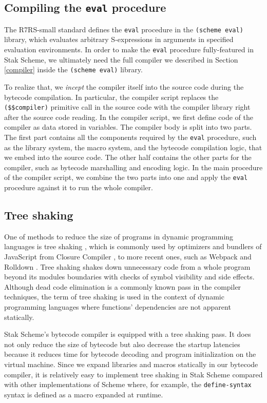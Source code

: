 \documentclass[sigplan, anonymous, review]{acmart}
\begin{document}
\subsection{Compiling the \texttt{eval} procedure} \label{inception}

The R7RS-small standard defines the \texttt{eval} procedure in the
\texttt{(scheme eval)} library, which evaluates arbitrary S-expressions in
arguments in specified evaluation environments.
In order to make the \texttt{eval} procedure fully-featured in Stak Scheme, we
ultimately need the full compiler we described in Section
\ref{compiler} inside the \texttt{(scheme eval)} library.

To realize that, we \textit{incept} the compiler itself into the
source code during the bytecode compilation.
In particular, the compiler script replaces
the \texttt{(\$\$compiler)} primitive call in the source code
with the compiler library right after the source code reading.
In the compiler script, we first define code of the compiler as
data stored in variables.
The compiler body is split into two parts.
The first part contains all the components required by the \texttt{eval}
procedure, such as the library system, the macro system, and the
bytecode compilation logic, that we embed into the source code.
The other half contains the other parts for the compiler, such
as bytecode marshalling and encoding logic.
In the main procedure of the compiler script, we combine the two
parts into one and apply the \texttt{eval} procedure against it to
run the whole compiler.

\subsection{Tree shaking}

One of methods to reduce the size of programs in dynamic programming
languages is tree shaking \cite{treeshaking}, which is commonly used
by optimizers and bundlers of JavaScript from Closure Compiler
\cite{closurecompiler}, to more recent ones, such as
Webpack \cite{webpack} and Rolldown \cite{rolldown}.
Tree shaking shakes down unnecessary code from a whole program
beyond its modules boundaries with checks of symbol visibility and side effects.
Although dead code elimination is a commonly known pass in the
compiler techniques, the term of tree shaking is used
in the context of dynamic programming languages where functions'
dependencies are not apparent statically.

Stak Scheme's bytecode compiler is equipped with a tree shaking pass.
It does not only reduce the size of bytecode but also
decrease the startup latencies because it reduces time for bytecode
decoding and program initialization on the virtual machine.
Since we expand libraries and macros statically
in our bytecode compiler, it is relatively easy to
implement tree shaking in Stak Scheme compared with other
implementations of Scheme where, for example, the
\texttt{define-syntax} syntax is defined as a macro expanded at runtime.
\end{document}

